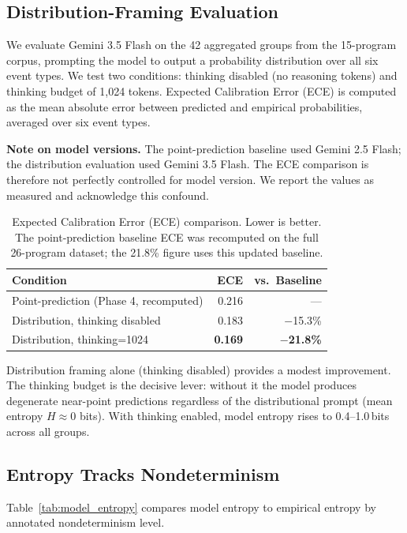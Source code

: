 \documentclass[sigconf,review,anonymous]{acmart}
\begin{document}
\subsection{Distribution-Framing Evaluation}

We evaluate Gemini 3.5 Flash on the 42 aggregated groups from the 15-program
corpus, prompting the model to output a probability distribution over all six
event types. We test two conditions: thinking disabled (no reasoning tokens) and
thinking budget of 1,024 tokens. Expected Calibration Error (ECE) is computed as
the mean absolute error between predicted and empirical probabilities, averaged
over six event types.

\textbf{Note on model versions.} The point-prediction baseline used Gemini 2.5
Flash; the distribution evaluation used Gemini 3.5 Flash. The ECE comparison is
therefore not perfectly controlled for model version. We report the values as
measured and acknowledge this confound.

\begin{table}[h]
\centering
\caption{Expected Calibration Error (ECE) comparison. Lower is better. The
point-prediction baseline ECE was recomputed on the full 26-program dataset;
the 21.8\% figure uses this updated baseline.}
\label{tab:ece}
\begin{tabular}{lrr}
\toprule
\textbf{Condition} & \textbf{ECE} & \textbf{vs.\ Baseline} \\
\midrule
Point-prediction (Phase 4, recomputed) & 0.216 & --- \\
Distribution, thinking disabled        & 0.183 & $-$15.3\% \\
Distribution, thinking=1024            & \textbf{0.169} & $-$\textbf{21.8\%} \\
\bottomrule
\end{tabular}
\end{table}

Distribution framing alone (thinking disabled) provides a modest improvement.
The thinking budget is the decisive lever: without it the model produces degenerate
near-point predictions regardless of the distributional prompt (mean entropy
$H{\approx}0$ bits). With thinking enabled, model entropy rises to 0.4--1.0\,bits
across all groups.

\subsection{Entropy Tracks Nondeterminism}

Table~\ref{tab:model_entropy} compares model entropy to empirical entropy by
annotated nondeterminism level.
\end{document}
